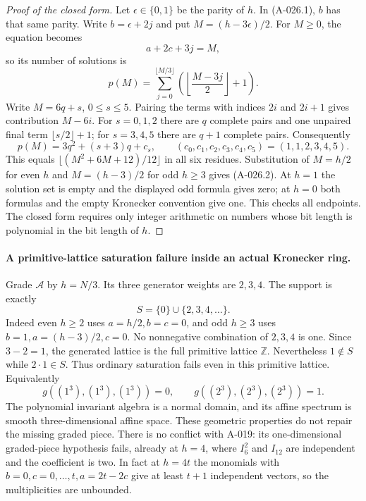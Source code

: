 \begin{proof}[Proof of the closed form]
Let $\epsilon\in\{0,1\}$ be the parity of $h$.
In (A-026.1), $b$ has that same parity. Write
$b=\epsilon+2j$ and put $M=(h-3\epsilon)/2$.
For $M\geq0$, the equation becomes
\[
                    a+2c+3j=M,
\]
so its number of solutions is
\[
           p(M)=\sum_{j=0}^{\lfloor M/3\rfloor}
                         \left(\left\lfloor\frac{M-3j}{2}\right\rfloor+1\right).
\]
Write $M=6q+s$, $0\leq s\leq5$. Pairing the terms
with indices $2i$ and $2i+1$ gives contribution $M-6i$.
For $s=0,1,2$ there are $q$ complete pairs and one
unpaired final term $\lfloor s/2\rfloor+1$; for
$s=3,4,5$ there are $q+1$ complete pairs. Consequently
\[
 p(M)=3q^2+(s+3)q+c_s,
           \qquad(c_0,c_1,c_2,c_3,c_4,c_5)=(1,1,2,3,4,5).
\]
This equals $\lfloor(M^2+6M+12)/12\rfloor$ in all
six residues. Substitution of $M=h/2$ for even $h$ and
$M=(h-3)/2$ for odd $h\geq3$ gives (A-026.2).
At $h=1$ the solution set is empty and the displayed odd
formula gives zero; at $h=0$ both formulas and the empty
Kronecker convention give one. This checks all endpoints.
The closed form requires only integer arithmetic on numbers
whose bit length is polynomial in the bit length of $h$.
\end{proof}

\paragraph{A primitive-lattice saturation failure inside an actual Kronecker ring.}
Grade $\mathcal A$ by $h=N/3$. Its three generator weights
are $2,3,4$. The support is exactly
\[
              S=\{0\}\cup\{2,3,4,\ldots\}.                     \tag{A-026.6}
\]
Indeed even $h\geq2$ uses $a=h/2,b=c=0$, and odd
$h\geq3$ uses $b=1,a=(h-3)/2,c=0$. No nonnegative
combination of $2,3,4$ is one. Since $3-2=1$, the
generated lattice is the full primitive lattice $\mathbb Z$.
Nevertheless $1\notin S$ while $2\cdot1\in S$.
Thus ordinary saturation fails even in this primitive lattice.
Equivalently
\[
                     g((1^3),(1^3),(1^3))=0,
             \qquad g((2^3),(2^3),(2^3))=1.
\]
The polynomial invariant algebra is a normal domain, and its
affine spectrum is smooth three-dimensional affine space.
These geometric properties do not repair the missing graded
piece. There is no conflict with A-019: its one-dimensional
graded-piece hypothesis fails, already at $h=4$, where
$I_6^2$ and $I_{12}$ are independent and the coefficient
is two. In fact at $h=4t$ the monomials with
$b=0,c=0,\ldots,t,a=2t-2c$ give at least $t+1$
independent vectors, so the multiplicities are unbounded.

